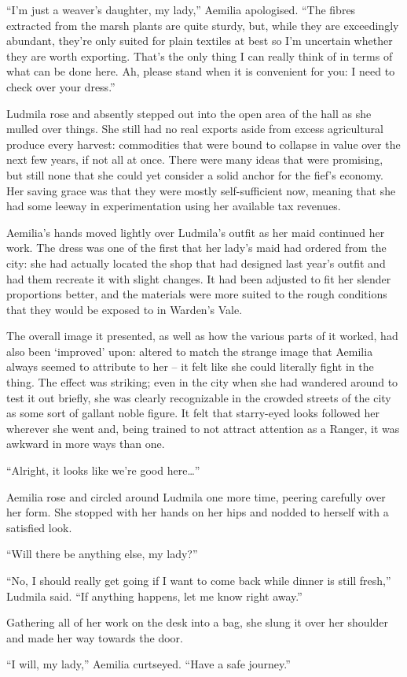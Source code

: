  

“I’m just a weaver’s daughter, my lady,” Aemilia apologised. “The fibres extracted from the marsh plants are quite sturdy, but, while they are exceedingly abundant, they’re only suited for plain textiles at best so I’m uncertain whether they are worth exporting. That’s the only thing I can really think of in terms of what can be done here. Ah, please stand when it is convenient for you: I need to check over your dress.”

 

Ludmila rose and absently stepped out into the open area of the hall as she mulled over things. She still had no real exports aside from excess agricultural produce every harvest: commodities that were bound to collapse in value over the next few years, if not all at once. There were many ideas that were promising, but still none that she could yet consider a solid anchor for the fief’s economy. Her saving grace was that they were mostly self-sufficient now, meaning that she had some leeway in experimentation using her available tax revenues.

 

Aemilia’s hands moved lightly over Ludmila’s outfit as her maid continued her work. The dress was one of the first that her lady’s maid had ordered from the city: she had actually located the shop that had designed last year’s outfit and had them recreate it with slight changes. It had been adjusted to fit her slender proportions better, and the materials were more suited to the rough conditions that they would be exposed to in Warden’s Vale.

 

The overall image it presented, as well as how the various parts of it worked, had also been ‘improved’ upon: altered to match the strange image that Aemilia always seemed to attribute to her – it felt like she could literally fight in the thing. The effect was striking; even in the city when she had wandered around to test it out briefly, she was clearly recognizable in the crowded streets of the city as some sort of gallant noble figure. It felt that starry-eyed looks followed her wherever she went and, being trained to not attract attention as a Ranger, it was awkward in more ways than one.

 

“Alright, it looks like we’re good here…”

 

Aemilia rose and circled around Ludmila one more time, peering carefully over her form. She stopped with her hands on her hips and nodded to herself with a satisfied look.

 

“Will there be anything else, my lady?”

 

“No, I should really get going if I want to come back while dinner is still fresh,” Ludmila said. “If anything happens, let me know right away.”

 

Gathering all of her work on the desk into a bag, she slung it over her shoulder and made her way towards the door.

 

“I will, my lady,” Aemilia curtseyed. “Have a safe journey.”